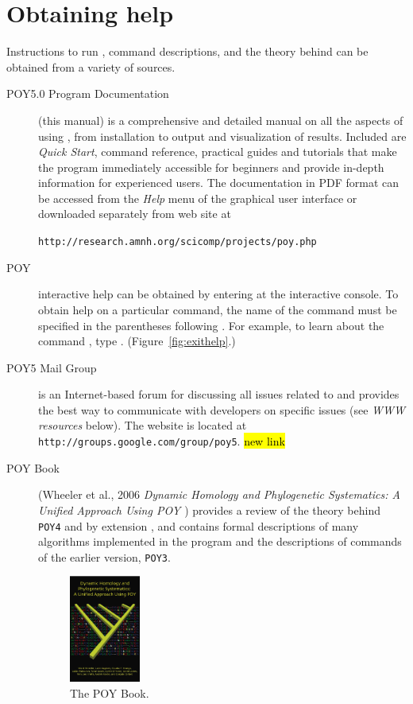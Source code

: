 {\section{Obtaining help} \label{sec:help}
Instructions to run \poy, command descriptions, and the theory behind \poy can be obtained from a variety of sources.
\begin{description}
\item[POY5.0 Program Documentation] (this manual) is a comprehensive and detailed manual on all the aspects of using \poy, from installation to output and visualization of results. Included are \emph{Quick Start}, \poy command reference, practical guides and tutorials that make the program immediately accessible for beginners and provide in-depth information for experienced users. The documentation in PDF format can be accessed from the \emph{Help} menu of the graphical user interface or downloaded separately from \poy web site at
\begin{center}
\texttt{http://research.amnh.org/scicomp/projects/poy.php}
\end{center}
\item[POY] interactive help can be obtained by entering  at the \poy interactive console. To obtain help on a particular command, the name of the command must be specified in the parentheses following . For example, to learn about the command , type . (Figure~\ref{fig:exithelp}.)
\item[POY5 Mail Group] is an Internet-based forum for discussing all issues related to \poy and provides the best way to communicate with \poy developers on specific issues (see \emph{WWW resources} below). The website is located at \texttt{http://groups.google.com/group/poy5}. \hl{new link}
\item[POY Book] (Wheeler et al., 2006 \emph{Dynamic Homology and Phylogenetic Systematics: A Unified Approach Using POY \cite{wheeleretal2006}}) provides a review of the theory behind \texttt{POY4} and by extension \poy, and contains formal descriptions of many algorithms implemented in the program and the descriptions of commands of the earlier version, \texttt{POY3}.
\begin{figure}[htbp]
   \centering
   \includegraphics[width=0.23\textwidth]{doc/figures/figpoybook.jpg}
   \caption{The POY Book.}
   \label{fig:figprocess}
\end{figure}
\end{description}

}
